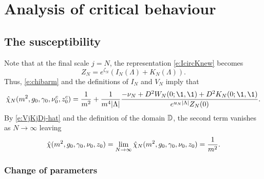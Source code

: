 \chapter{Analysis of critical behaviour}


\section{The susceptibility}

Note that at the final scale $j = N$, the representation \eqref{e:IcircKnew}
becomes
\begin{equation}
Z_N = e^{\zeta_N} (I_N(\Lambda) + K_N(\Lambda)).
\end{equation}
Thus, \eqref{e:chibarm} and the definitions of $I_N$ and $V_N$ imply that
\begin{equation}
\hat\chi_N(m^2, \gcc_0, \gamma_0, \nu_0^c, z_0^c)
	=
\frac{1}{m^2}
	+
\frac{1}{m^4 |\Lambda|}
\frac{-\nu_N + D^2 W_N(0; \1, \1) + D^2 K_N(0; \1, \1)}{e^{u_N |\Lambda|} Z_N(0)}.
\end{equation}
By \eqref{e:VjKjDj-hat} and the definition of the domain $\mathbb{D}$, the second term
vanishes as $N\to\infty$ leaving
\begin{equation}
\label{e:chi-m-hat}
\hat\chi(m^2, g_0, \gamma_0, \nu_0, z_0)
	=
\lim_{N\rightarrow\infty} \hat\chi_N(m^2, g_0, \gamma_0, \nu_0, z_0)
	=
\frac{1}{m^2}.
\end{equation}


\subsection{Change of parameters}
\label{sec:nuztilde}

